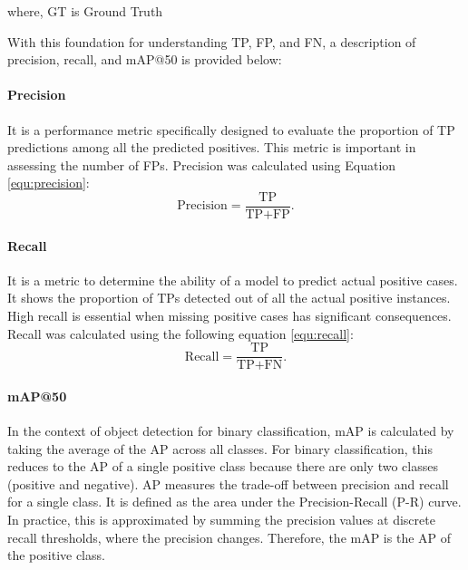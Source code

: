 \documentclass{ieeeaccess}
\begin{document}
 where, 
 GT is Ground Truth

With this foundation for understanding TP, FP, and FN, a description of precision, recall, and mAP@50 is provided below:

\paragraph{Precision}
It is a performance metric specifically designed to evaluate the proportion of TP predictions among all the predicted positives. This metric is important in assessing the number of FPs. Precision was calculated using Equation \ref{equ:precision}:
\begin{equation}
    \text{Precision} = \frac{\text{TP}}{\text{TP}+\text{FP}} .
    \label{equ:precision}
\end{equation}

\paragraph{Recall}It is a metric to determine the ability of a model to predict actual positive cases. It shows the proportion of TPs detected out of all the actual positive instances. High recall is essential when missing positive cases has significant consequences. Recall was calculated using the following equation \ref{equ:recall}:
\begin{equation}
    \text{Recall} = \frac{\text{TP}}{\text{TP}+\text{FN}} .
    \label{equ:recall}
\end{equation}
\vspace{0.1cm}

\paragraph{mAP@50}
In the context of object detection for binary classification, mAP is calculated by taking the average of the AP across all classes. For binary classification, this reduces to the AP of a single positive class because there are only two classes (positive and negative). AP measures the trade-off between precision and recall for a single class. It is defined as the area under the Precision-Recall (P-R) curve. In practice, this is approximated by summing the precision values at discrete recall thresholds, where the precision changes. Therefore, the mAP is the AP of the positive class.
\end{document}
